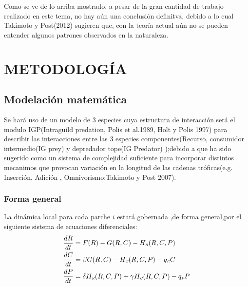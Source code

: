 \documentclass[a4paper,12pt]{article}
\newcommand{\C}{\textit{\tiny C}}
\newcommand{\R}{\textit{\tiny R}}
\begin{document}
Como se ve de lo arriba mostrado, a pesar de la gran cantidad de trabajo realizado en este tema, no hay a\'un una conclusi\'on definitva, debido a lo cual Takimoto y Post(2012) sugieren que, con la teor\'ia actual a\'un no se pueden entender algunos patrones observados en la naturaleza.
\section{METODOLOG\'IA}
\subsection{Modelaci\'on matem\'atica}
Se har\'a uso de un modelo de 3 especies cuya estructura de interacci\'on ser\'a  el modulo IGP(Intraguild predation, Polis et al.1989, Holt y Polis 1997) para describir las interacciones entre las 3 especies componentes(Recurso, consumidor intermedio(IG prey) y depredador tope(IG Predator) );debido a que ha sido sugerido como un sistema de complejidad suficiente para incorporar distintos mecanimos que provocan variaci\'on en la longitud de las cadenas tr\'oficas(e.g. Inserci\'on, Adici\'on , Omnivorismo;Takimoto y Post 2007).
\subsubsection*{Forma general}
La din\'amica local para cada parche $i$ estar\'a gobernada ,de forma general,por el siguiente sistema de ecuaciones diferenciales:
\begin{align}
&\frac{dR}{dt} = F(R) -G(R,C)-H_{\R}(R,C,P)  \\
&\frac{dC}{dt} = \beta G(R,C)-H_{\C}(R,C,P) - q_{\C}C  \\
&\frac{dP}{dt} = \delta H_{\R}(R,C,P) +\gamma H_{\C}(R,C,P) -q_{\textit{\tiny P}}P
\end{align}
\end{document}
